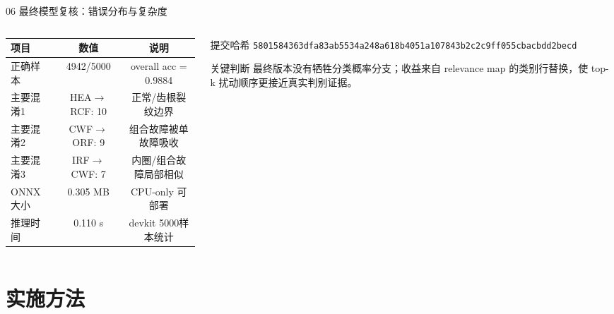 \documentclass[aspectratio=169]{beamer}
\newcommand{\zipsha}{\texttt{5801584363dfa83ab5534a248a618b4051a107843b2c2c9ff055cbacbdd2becd}}
\begin{document}
\begin{frame}{06 最终模型复核：错误分布与复杂度}
    \small
    \begin{columns}[T,onlytextwidth]
        \begin{column}{0.52\textwidth}
            \begin{table}
                \centering
                \scriptsize
                \begin{tabular}{lcc}
                    \toprule
                    项目 & 数值 & 说明 \\
                    \midrule
                    正确样本 & 4942/5000 & overall acc = 0.9884 \\
                    主要混淆1 & HEA$\rightarrow$RCF: 10 & 正常/齿根裂纹边界 \\
                    主要混淆2 & CWF$\rightarrow$ORF: 9 & 组合故障被单故障吸收 \\
                    主要混淆3 & IRF$\rightarrow$CWF: 7 & 内圈/组合故障局部相似 \\
                    ONNX大小 & 0.305 MB & CPU-only 可部署 \\
                    推理时间 & 0.110 s & devkit 5000样本统计 \\
                    \bottomrule
                \end{tabular}
            \end{table}
        \end{column}
        \begin{column}{0.44\textwidth}
            \begin{block}{提交哈希}
                \scriptsize
                \zipsha
            \end{block}
            \begin{block}{关键判断}
                最终版本没有牺牲分类概率分支；收益来自 relevance map 的类别行替换，使 top-k 扰动顺序更接近真实判别证据。
            \end{block}
        \end{column}
    \end{columns}
\end{frame}

\section{实施方法}
\end{document}
